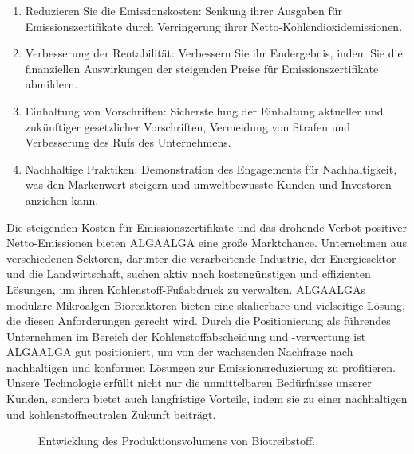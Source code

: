 \begin{enumerate}
    \item Reduzieren Sie die Emissionskosten: Senkung ihrer Ausgaben für Emissionszertifikate durch Verringerung ihrer Netto-Kohlendioxidemissionen.
    \item Verbesserung der Rentabilität: Verbessern Sie ihr Endergebnis, indem Sie die finanziellen Auswirkungen der steigenden Preise für Emissionszertifikate abmildern.
    \item Einhaltung von Vorschriften: Sicherstellung der Einhaltung aktueller und zukünftiger gesetzlicher Vorschriften, Vermeidung von Strafen und Verbesserung des Rufs des Unternehmens.
    \item Nachhaltige Praktiken: Demonstration des Engagements für Nachhaltigkeit, was den Markenwert steigern und umweltbewusste Kunden und Investoren anziehen kann.
\end{enumerate}

Die steigenden Kosten für Emissionszertifikate und das drohende Verbot positiver Netto-Emissionen bieten ALGAALGA eine große Marktchance.
Unternehmen aus verschiedenen Sektoren, darunter die verarbeitende Industrie, der Energiesektor und die Landwirtschaft, suchen aktiv nach kostengünstigen und effizienten Lösungen, um ihren Kohlenstoff-Fußabdruck zu verwalten.
ALGAALGAs modulare Mikroalgen-Bioreaktoren bieten eine skalierbare und vielseitige Lösung, die diesen Anforderungen gerecht wird.
Durch die Positionierung als führendes Unternehmen im Bereich der Kohlenstoffabscheidung und -verwertung ist ALGAALGA gut positioniert, um von der wachsenden Nachfrage nach nachhaltigen und konformen Lösungen zur Emissionsreduzierung zu profitieren.
Unsere Technologie erfüllt nicht nur die unmittelbaren Bedürfnisse unserer Kunden, sondern bietet auch langfristige Vorteile, indem sie zu einer nachhaltigen und kohlenstoffneutralen Zukunft beiträgt.

\begin{figure}[h]
    \centering
    
    \label{fig:biofuel production}
    \caption[Entwicklung des Produktionsvolumens von Biotreibstoff]{Entwicklung des Produktionsvolumens von Biotreibstoff.}
\end{figure}